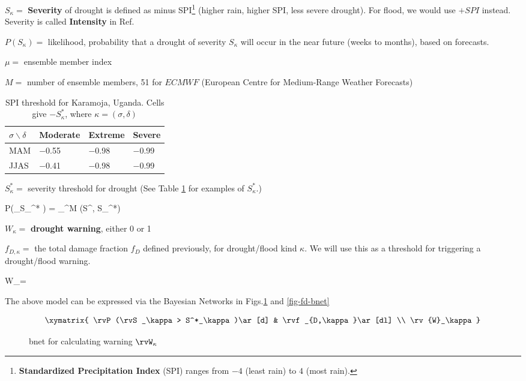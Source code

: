 \documentclass[12pt]{article}
\begin{document}
$S_\kappa=$ {\bf Severity } of drought is defined as minus SPI\footnote{{\bf Standardized Precipitation Index} (SPI) ranges from $-4$ (least rain) to $4$ (most rain).} (higher rain,
higher SPI, less 
severe drought). 
For flood, we would
use $+SPI$ instead.
Severity is called {\bf Intensity}
in Ref.\cite{climada}

$ P(S_\kappa)=$ likelihood, 
probability  that a drought of severity $S_\kappa$  will occur in the near future (weeks to months), based on forecasts.

$\mu=$ ensemble member index

$M=$ number of ensemble members, 51 for $ECMWF$ (European Centre for Medium-Range Weather Forecasts)



\begin{table}[!h]
\begin{tabular}{|l|l|l|l|}
\hline
$\sigma\backslash\delta$ & \cellcolor[HTML]{FFFFC7}Moderate & \cellcolor[HTML]{FFFFC7}Extreme & \cellcolor[HTML]{FFFFC7}Severe \\ \hline
\cellcolor[HTML]{FFFFC7}MAM & $-$0.55 & $-$0.98 & $-$0.99 \\ \hline
\cellcolor[HTML]{FFFFC7}JJAS & $-$0.41 & $-$0.98 & $-$0.99 \\ \hline
\end{tabular}
\caption{SPI threshold  for Karamoja, Uganda.
Cells give $-S^*_\kappa$,
where $\kappa=(\sigma, \delta)$}
\label{tab-spi-karamoja}
\end{table}

$S_\kappa^*  =$ severity threshold 
   for drought (See Table
   \ref{tab-spi-karamoja}
   for examples
   of $S^*_\kappa$.)
   

\beq
P(\rvS_\kappa\geq S_\kappa^*  ) =  \sum_{}^{M} \indi(S^{\kappa,\mu} \geq S_\kappa^*) 
\eeq

$W_\kappa=$ {\bf drought warning}, either 0 or 1

$f_{D, \kappa}=$ the total damage fraction $f_D$ defined
previously, for drought/flood kind $\kappa$. We 
will use this as a threshold for triggering  a  drought/flood warning.



\beq
W_\kappa=
\indi{}
\eeq

The above model can be 
expressed via the Bayesian Networks
in Figs.\ref{fig-W-bnet}
and \ref{fig-fd-bnet}

\begin{figure}[h!]
$$
\xymatrix{
\rvP(\rvS_\kappa> S^*_\kappa)\ar[d] 
& \rvf_{D,\kappa}\ar[dl]
\\
\rv{W}_\kappa
}
$$
\caption{bnet for calculating warning $\rvW_\kappa$}
\label{fig-W-bnet}
\end{figure}
\end{document}
